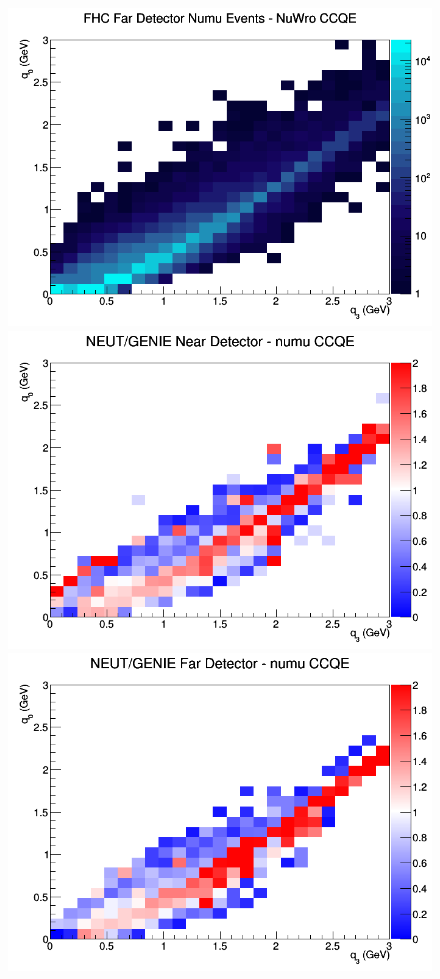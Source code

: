 \documentclass[12pt]{article}
\begin{document}
\begin{figure}[h]
\endminipage
{}
\includegraphics[width=\linewidth]{eff_q0_q3/FGT/CCQE_FHC_FD_numu_q3_q0_NuWro.png}
\endminipage
\newline
{}
\includegraphics[width=\linewidth]{eff_q0_q3/FGT/ratios/CCQE_NEUT_GENIE_numu_near_q3_q0.png}
\endminipage
{}
\includegraphics[width=\linewidth]{eff_q0_q3/FGT/ratios/CCQE_NEUT_GENIE_numu_far_q3_q0.png}

\end{figure}
\end{document}
